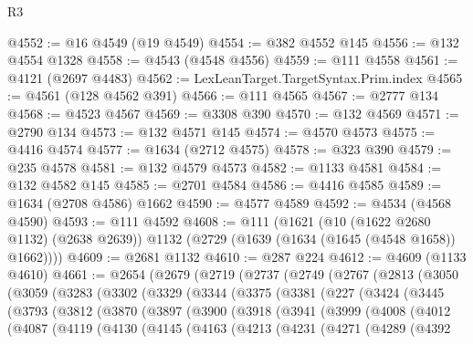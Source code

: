 \begin{lexlean}{R3}
\begin{coremodule}
@4552 := @16 @4549 (@19 @4549)
@4554 := @382 @4552 @145
@4556 := @132 @4554 @1328
@4558 := @4543 (@4548 @4556)
@4559 := @111 @4558
@4561 := @4121 (@2697 @4483)
@4562 := LexLeanTarget.TargetSyntax.Prim.index
@4565 := @4561 (@128 @4562 @391)
@4566 := @111 @4565
@4567 := @2777 @134
@4568 := @4523 @4567
@4569 := @3308 @390
@4570 := @132 @4569
@4571 := @2790 @134
@4573 := @132 @4571 @145
@4574 := @4570 @4573
@4575 := @4416 @4574
@4577 := @1634 (@2712 @4575)
@4578 := @323 @390
@4579 := @235 @4578
@4581 := @132 @4579 @4573
@4582 := @1133 @4581
@4584 := @132 @4582 @145
@4585 := @2701 @4584
@4586 := @4416 @4585
@4589 := @1634 (@2708 @4586) @1662
@4590 := @4577 @4589
@4592 := @4534 (@4568 @4590)
@4593 := @111 @4592
@4608 := @111
    (@1621
      (@10 (@1622 @2680 @1132) (@2638 @2639))
      @1132
      (@2729 (@1639 (@1634 (@1645 (@4548 @1658)) @1662))))
@4609 := @2681 @1132
@4610 := @287 @224
@4612 := @4609 (@1133 @4610)
@4661 := @2654
    (@2679
      (@2719
        (@2737
          (@2749
            (@2767
              (@2813
                (@3050
                  (@3059
                    (@3283
                      (@3302
                        (@3329
                          (@3344
                            (@3375
                              (@3381
                                (@227
                                  (@3424
                                    (@3445
                                      (@3793
                                        (@3812
                                          (@3870
                                            (@3897
                                              (@3900
                                                (@3918
                                                  (@3941
                                                    (@3999
                                                      (@4008
                                                        (@4012
                                                          (@4087
                                                            (@4119
                                                              (@4130
                                                                (@4145
                                                                  (@4163
                                                                    (@4213
                                                                      (@4231
                                                                        (@4271
                                                                          (@4289
                                                                            (@4392

\end{coremodule}
\end{lexlean}
